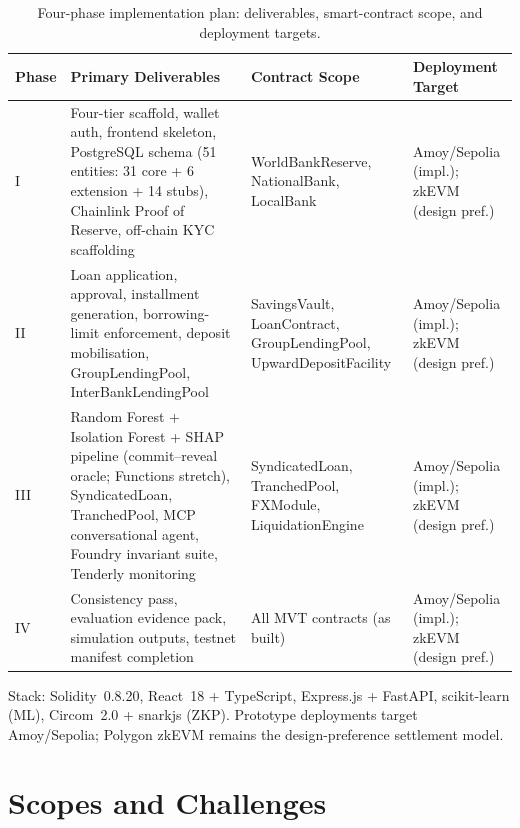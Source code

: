 \documentclass[12pt,a4paper]{report}
\newcommand{\tableheadcolor}{\rowcolor{TableHeadBg}}
\newcommand{\tableheadfont}{\bfseries}
\begin{document}
\begin{table}[H]
\centering
\small
\setlength{\tabcolsep}{5pt}
\renewcommand{\arraystretch}{1.18}
\caption[Phase--deliverable mapping]{Four-phase implementation plan:
deliverables, smart-contract scope, and deployment targets.}
\label{tab:phase-deliverables}
\begin{tabular}{@{}>{\raggedright\arraybackslash}p{0.95cm}>{\raggedright\arraybackslash}p{4.05cm}>{\raggedright\arraybackslash}p{4.55cm}>{\raggedright\arraybackslash}p{4.15cm}@{}}
\toprule
\tableheadcolor
\tableheadfont Phase &
\tableheadfont Primary Deliverables &
\tableheadfont Contract Scope &
\tableheadfont Deployment Target \\
\midrule
I &
  Four-tier scaffold, wallet auth, frontend skeleton,
  PostgreSQL schema (51 entities: 31 core + 6 extension + 14 stubs),
  Chainlink Proof of Reserve, off-chain KYC scaffolding &
  WorldBankReserve, NationalBank, LocalBank &
  Amoy/Sepolia (impl.); zkEVM (design pref.) \\
\rowcolor{RowShade}
II &
  Loan application, approval, installment generation,
  borrowing-limit enforcement, deposit mobilisation,
  GroupLendingPool, InterBankLendingPool &
  SavingsVault, LoanContract, GroupLendingPool,
  UpwardDepositFacility &
  Amoy/Sepolia (impl.); zkEVM (design pref.) \\
III &
  Random Forest + Isolation Forest + SHAP pipeline
  (commit--reveal oracle; Functions stretch), SyndicatedLoan,
  TranchedPool, MCP conversational agent,
  Foundry invariant suite, Tenderly monitoring &
  SyndicatedLoan, TranchedPool,
  FXModule, LiquidationEngine &
  Amoy/Sepolia (impl.); zkEVM (design pref.) \\
\rowcolor{RowShade}
IV &
  Consistency pass, evaluation evidence pack, simulation outputs,
  testnet manifest completion &
  All MVT contracts (as built) &
  Amoy/Sepolia (impl.); zkEVM (design pref.) \\
\bottomrule
\end{tabular}
\end{table}

\noindent Stack: Solidity~0.8.20, React~18 + TypeScript, Express.js + FastAPI, scikit-learn (ML), Circom~2.0 + snarkjs (ZKP). Prototype deployments target Amoy/Sepolia; Polygon zkEVM remains the design-preference settlement model.

\section{Scopes and Challenges}
\label{sec:scopes-challenges}
\end{document}
